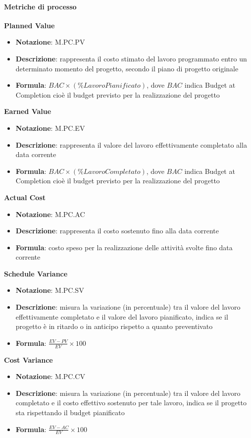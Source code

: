 \paragraph{Metriche di processo}
\textbf{Planned Value}
\begin{itemize}
    \item \textbf{Notazione}: M.PC.PV
    \item \textbf{Descrizione}: rappresenta il costo stimato del lavoro programmato entro un determinato momento del progetto, secondo il piano di progetto originale
    \item \textbf{Formula}: $BAC \times (\% Lavoro Pianificato)$, dove $BAC$ indica Budget at Completion cioè il budget previsto per la realizzazione del progetto
\end{itemize}
\textbf{Earned Value}
\begin{itemize}
    \item \textbf{Notazione}: M.PC.EV
    \item \textbf{Descrizione}: rappresenta il valore del lavoro effettivamente completato alla data corrente
    \item \textbf{Formula}: $BAC \times (\% Lavoro Completato)$, dove $BAC$ indica Budget at Completion cioè il budget previsto per la realizzazione del progetto
\end{itemize}
\textbf{Actual Cost}
\begin{itemize}
    \item \textbf{Notazione}: M.PC.AC
    \item \textbf{Descrizione}: rappresenta il costo sostenuto fino alla data corrente
    \item \textbf{Formula}: costo speso per la realizzazione delle attività svolte fino data corrente
\end{itemize}
\textbf{Schedule Variance}
\begin{itemize}
    \item \textbf{Notazione}: M.PC.SV
    \item \textbf{Descrizione}: misura la variazione (in percentuale) tra il valore del lavoro effettivamente completato e il valore del lavoro pianificato, indica se il progetto è in ritardo o in anticipo rispetto a quanto preventivato
    \item \textbf{Formula}: $\frac{EV - PV}{EV} \times 100$
\end{itemize}
\textbf{Cost Variance}
\begin{itemize}
    \item \textbf{Notazione}: M.PC.CV
    \item \textbf{Descrizione}: misura la variazione (in percentuale) tra il valore del lavoro completato e il costo effettivo sostenuto per tale lavoro, indica se il progetto sta rispettando il budget pianificato
    \item \textbf{Formula}: $\frac{EV - AC}{EV} \times 100$
\end{itemize}

